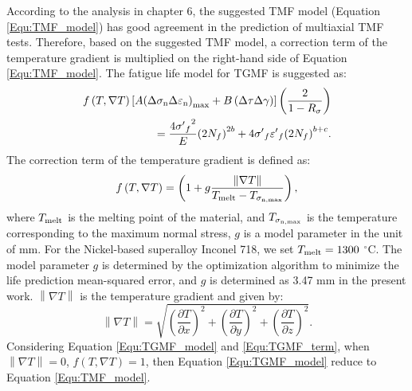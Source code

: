 \documentclass[preprint,5p,twocolumn,11pt,sort&compress]{elsarticle}
\begin{document}
According to the analysis in chapter 6, the suggested TMF model (Equation \eqref{Equ:TMF_model}) has good agreement in the prediction of multiaxial TMF tests.
Therefore, based on the suggested TMF model, a correction term of the temperature gradient is multiplied on the right-hand side of Equation \eqref{Equ:TMF_model}. The fatigue life model for TGMF is suggested as:
\begin{equation}
\begin{aligned}
f\left( {T,\nabla T} \right)\left[ {A{{\left( {\Delta {\sigma _{\rm n}}\Delta {\varepsilon _{\rm n}}} \right)}_{\max }} + B\left( {\Delta \tau \Delta \gamma } \right)} \right]\left( {\frac{2}{{1 - {R_\sigma }}}} \right) \\ 
= \frac{{4{{\sigma '}_f}^2}}{E}{\left( {2{N_f}} \right)^{2b}} + 4{{\sigma '}_f}{{\varepsilon '}_f}{\left( {2{N_f}} \right)^{b + c}}.
\end{aligned}
\label{Equ:TGMF_model}
\end{equation}
The correction term of the temperature gradient is defined as:
\begin{equation}
f\left( {T,\nabla T} \right) = \left( {1 + g\frac{{\left\| {\nabla T} \right\|}}{{{T_{{\rm{melt}}}} - {T_{{\sigma _{\rm n,\max }}}}}}} \right),
\label{Equ:TGMF_term}
\end{equation}
where ${T_{{\rm{melt}}}}$ is the melting point of the material, and ${T_{{\sigma _{\rm n,\max }}}}$ is the temperature corresponding to the maximum normal stress, $g$ is a model parameter in the unit of mm. For the Nickel-based superalloy Inconel 718, we set ${T_{{\rm{melt}}}}=1300$ $^\circ$C. The model parameter $g$ is determined by the optimization algorithm to minimize the life prediction
mean-squared error, and $g$ is determined as 3.47 mm in the present work. ${\left\| {\nabla T} \right\|}$ is the temperature gradient and given by:
\begin{equation}
\left\| {\nabla T} \right\| = \sqrt {{{\left( {\frac{{\partial T}}{{\partial x}}} \right)}^2} + {{\left( {\frac{{\partial T}}{{\partial y}}} \right)}^2} + {{\left( {\frac{{\partial T}}{{\partial z}}} \right)}^2}}.
\end{equation}
Considering Equation \eqref{Equ:TGMF_model} and \eqref{Equ:TGMF_term}, when $\left\| {\nabla T} \right\|=0$, $f\left( {T,\nabla T} \right)=1$, then Equation \eqref{Equ:TGMF_model} reduce to Equation \eqref{Equ:TMF_model}.
\end{document}
